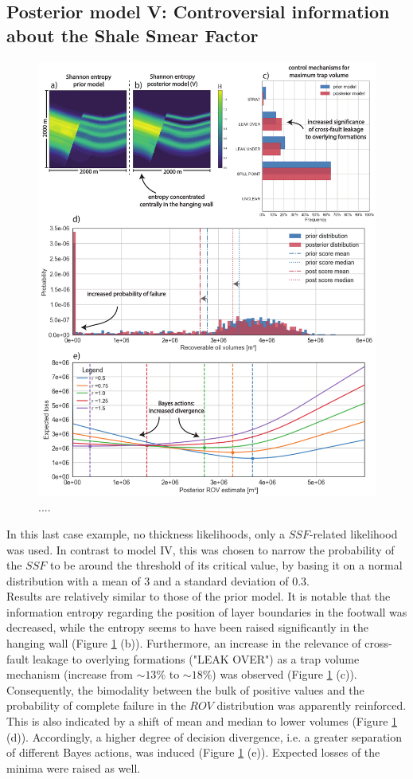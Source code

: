 		\subsection{Posterior model V: Controversial information about the Shale Smear Factor}%
		\begin{figure}[p!]
			\centering
			\includegraphics[width=1\textwidth]{Figures/ML5}
			\caption{....}\label{fig:ML5}
		\end{figure}
		In this last case example, no thickness likelihoods, only a $SSF$-related likelihood was used. In contrast to model IV, this was chosen to narrow the probability of the $SSF$ to be around the threshold of its critical value, by basing it on a normal distribution with a mean of 3 and a standard deviation of 0.3.\\
		Results are relatively similar to those of the prior model. It is notable that the information entropy regarding the position of layer boundaries in the footwall was decreased, while the entropy seems to have been raised significantly in the hanging wall (Figure \ref{fig:ML5} (b)). Furthermore, an increase in the relevance of cross-fault leakage to overlying formations ("LEAK OVER") as a trap volume mechanism (increase from $\sim13\%$ to $\sim18\%$) was observed (Figure \ref{fig:ML5} (c)). Consequently, the bimodality between the bulk of positive values and the probability of complete failure in the $ROV$ distribution was apparently reinforced. This is also indicated by a shift of mean and median to lower volumes (Figure \ref{fig:ML5} (d)). Accordingly, a higher degree of decision divergence, i.e. a greater separation of different Bayes actions, was induced (Figure \ref{fig:ML5} (e)). Expected losses of the minima were raised as well.\\

